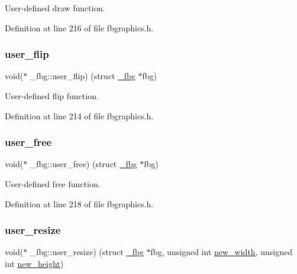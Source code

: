 User-\/defined draw function. 



Definition at line 216 of file fbgraphics.\+h.

\mbox{\label{struct__fbg_a3f2ad2eb06555cdbe2d18f541231cb37}} 
\subsubsection{\texorpdfstring{user\+\_\+flip}{user\_flip}}
{\footnotesize\ttfamily void($\ast$ \+\_\+fbg\+::user\+\_\+flip) (struct \mbox{\hyperlink{struct__fbg}{\+\_\+fbg}} $\ast$fbg)}



User-\/defined flip function. 



Definition at line 214 of file fbgraphics.\+h.

\mbox{\label{struct__fbg_a88d48b502672cfb8bd2c94ea3feac8d0}} 
\subsubsection{\texorpdfstring{user\+\_\+free}{user\_free}}
{\footnotesize\ttfamily void($\ast$ \+\_\+fbg\+::user\+\_\+free) (struct \mbox{\hyperlink{struct__fbg}{\+\_\+fbg}} $\ast$fbg)}



User-\/defined free function. 



Definition at line 218 of file fbgraphics.\+h.

\mbox{\label{struct__fbg_a68add70dac4b055809c1bcab1e65b18d}} 
\subsubsection{\texorpdfstring{user\+\_\+resize}{user\_resize}}
{\footnotesize\ttfamily void($\ast$ \+\_\+fbg\+::user\+\_\+resize) (struct \mbox{\hyperlink{struct__fbg}{\+\_\+fbg}} $\ast$fbg, unsigned int \mbox{\hyperlink{struct__fbg_a95859bd418a5cfff155cdb1421d295ef}{new\+\_\+width}}, unsigned int \mbox{\hyperlink{struct__fbg_a509aa5f8f0a94d8313bb4da777aa64bc}{new\+\_\+height}})}



